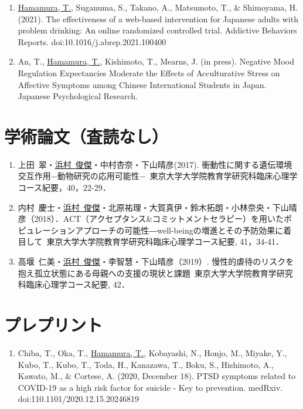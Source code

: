 \documentclass{article}
\begin{document}
\begin{enumerate}
	\item \underline{Hamamura, T.}, Suganuma, S., Takano, A., Matsumoto, T., \& Shimoyama, H. (2021). The effectiveness of a web-based intervention for Japanese adults with problem drinking: An online randomized controlled trial. Addictive Behaviors Reports. doi:10.1016/j.abrep.2021.100400
	\item An, T., \underline{Hamamura, T.}, Kishimoto, T., Mearns, J. (in press). Negative Mood Regulation Expectancies Moderate the Effects of Acculturative Stress on Affective Symptoms among Chinese International Students in Japan. Japanese Psychological Research.
\end{enumerate}

\section{学術論文（査読なし）}
\begin{enumerate}
	\item 上田\ 翠・\underline{浜村\ 俊傑}・中村杏奈・下山晴彦(2017). 衝動性に関する遺伝環境交互作用−動物研究の応用可能性−\ 東京大学大学院教育学研究科臨床心理学コース紀要，40，22-29．
	\item 内村\ 慶士・\underline{浜村\ 俊傑}・北原祐理・大賀真伊・鈴木拓朗・小林奈央・下山晴彦（2018）．ACT（アクセプタンス\&コミットメントセラピー）を用いたポピュレーションアプローチの可能性―well-beingの増進とその予防効果に着目して\ 東京大学大学院教育学研究科臨床心理学コース紀要, 41，34-41．
	\item 高堰\ 仁美・\underline{浜村\ 俊傑}・李智慧・下山晴彦（2019）. 慢性的虐待のリスクを抱え孤立状態にある母親への支援の現状と課題\ 東京大学大学院教育学研究科臨床心理学コース紀要, 42．
\end{enumerate}

\section{プレプリント}
\begin{enumerate}
	\item Chiba, T., Oka, T., \underline{Hamamura, T.}, Kobayashi, N., Honjo, M., Miyake, Y., Kubo, T., Kubo, T., Toda, H., Kanazawa, T., Boku, S., Hishimoto, A., Kawato, M., \& Cortese, A. (2020, December 18). PTSD symptoms related to COVID-19 as a high risk factor for suicide - Key to prevention. medRxiv. doi:110.1101/2020.12.15.20246819
\end{enumerate}
\end{document}
